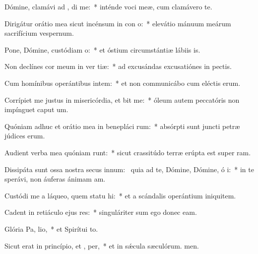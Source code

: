 \item Dómine, clamávi ad , di me:~* inténde voci meæ, cum clamávero  te.
\item Dirigátur orátio mea sicut incénsum in con o:~* elevátio mánuum meárum sacrifícium vespernum.
\item Pone, Dómine, custódiam  o:~* et óstium circumstántiæ lábiis is.
\item Non declínes cor meum in ver tiæ:~* ad excusándas excusatiónes in pectis.
\item Cum homínibus operántibus intem:~* et non communicábo cum eléctis erum.
\item Corrípiet me justus in misericórdia, et bit me:~* óleum autem peccatóris non impínguet caput um.
\item Quóniam adhuc et orátio mea in benepláci rum:~* absórpti sunt juncti petræ júdices erum.
\item Audient verba mea quóniam runt:~* sicut crassitúdo terræ erúpta est super ram.
\item Dissipáta sunt ossa nostra secus innum:~\pscross{} quia ad te, Dómine, Dómine, ó i:~* in te sperávi, non áuferas ánimam am.
\item Custódi me a láqueo, quem statu hi:~* et a scándalis operántium iniquitem.
\item Cadent in retiáculo ejus res:~* singuláriter sum ego donec eam.
\item Glória Pa,  lio,~* et Spirítui to.
\item Sicut erat in princípio, et ,  per,~* et in sǽcula sæculórum. men.
